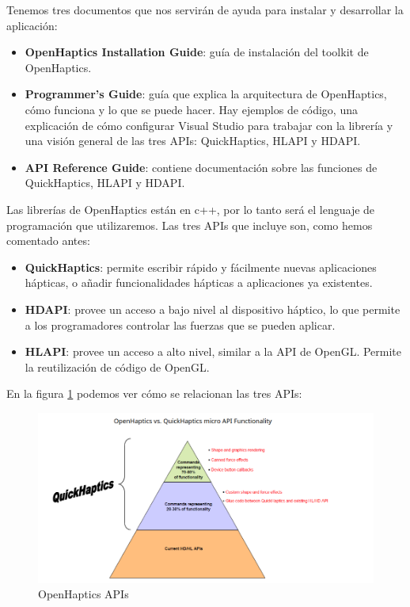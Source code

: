 \documentclass[a4paper,11pt, oneside]{book}
\begin{document}
Tenemos tres documentos que nos servirán de ayuda para instalar y desarrollar la aplicación:
\begin{itemize}
	\item \textbf{OpenHaptics Installation Guide}: guía de instalación del toolkit de OpenHaptics.
	\item \textbf{Programmer’s Guide}: guía que explica la arquitectura de OpenHaptics, cómo funciona y lo que se puede hacer. Hay ejemplos de código, una explicación de cómo configurar Visual Studio para trabajar con la librería y una visión general de las tres APIs: QuickHaptics, HLAPI y HDAPI.
	\item \textbf{API Reference Guide}: contiene documentación sobre las funciones de QuickHaptics, HLAPI y HDAPI.
\end{itemize}

Las librerías de OpenHaptics están en c++, por lo tanto será el lenguaje de programación que utilizaremos. Las tres APIs que incluye son, como hemos comentado antes:
\begin{itemize}
	\item \textbf{QuickHaptics}: permite escribir rápido y fácilmente nuevas aplicaciones hápticas, o añadir funcionalidades hápticas a aplicaciones ya existentes.  
	\item \textbf{HDAPI}: provee un acceso a bajo nivel al dispositivo háptico, lo que permite a los programadores controlar las fuerzas que se pueden aplicar. 
	\item \textbf{HLAPI}: provee un acceso a alto nivel, similar a la API de OpenGL. Permite la reutilización de código de OpenGL.
\end{itemize}
En la figura \ref{fig:apis} podemos ver cómo se relacionan las tres APIs:


\begin{figure}[H]
	
	\centering
	\includegraphics[width=1.1\linewidth]{OPENHAPTICS}
	\caption{OpenHaptics APIs}
	\label{fig:apis}
	
\end{figure}
\end{document}
